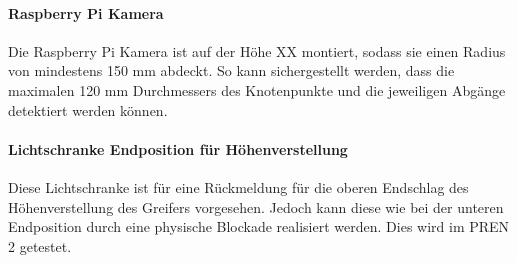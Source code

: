 \documentclass[main.tex]{subfiles} %
\begin{document}
\paragraph{Raspberry Pi Kamera}
Die Raspberry Pi Kamera ist auf der Höhe XX montiert, sodass sie einen Radius von mindestens 150 mm abdeckt.
So kann sichergestellt werden, dass die maximalen 120 mm Durchmessers des Knotenpunkte und die jeweiligen Abgänge detektiert werden können.

\paragraph{Lichtschranke Endposition für Höhenverstellung}
Diese Lichtschranke ist für eine Rückmeldung für die oberen Endschlag des Höhenverstellung des Greifers vorgesehen.
Jedoch kann diese wie bei der unteren Endposition durch eine physische Blockade realisiert werden. Dies wird im PREN 2 getestet.
\end{document}
